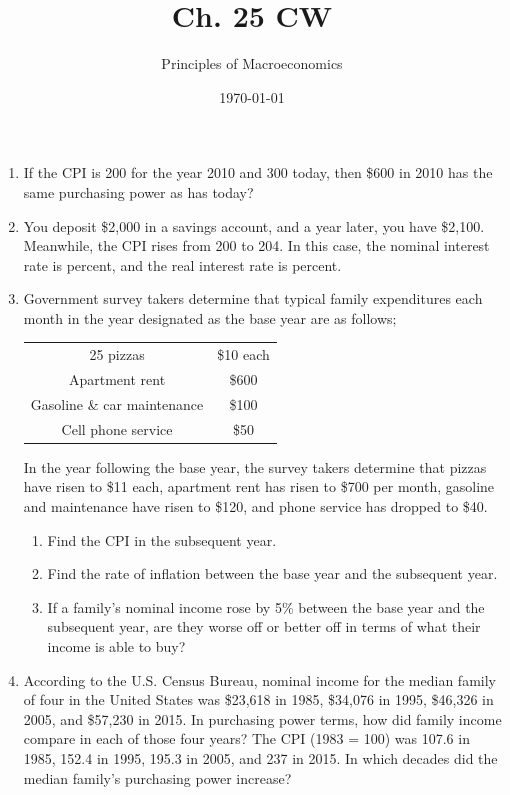 \documentclass{article}
\title{Ch. 25 CW}
\author{Principles of Macroeconomics}
\date{\today}
\begin{document}
\maketitle

\begin{enumerate}

\item If the CPI is 200 for the year 2010 and 300 today, then \$600 in 2010 has the same purchasing power as \underline{\phantom{xxxxxxxxxx}} has today?

\item You deposit \$2,000 in a savings account, and a year later, you have \$2,100. Meanwhile, the CPI rises from 200 to 204. In this case, the nominal interest rate is \underline{\phantom{xxxxxxxxxx}} percent, and the real interest rate is \underline{\phantom{xxxxxxxxxx}} percent.

\item Government survey takers determine that typical family expenditures each month in the year designated as the base year are as follows;
	\begin{center}
	\begin{tabular}{c c}
	25 pizzas & \$10 each \\
	Apartment rent & \$600 \\
	Gasoline \& car maintenance & \$100 \\
	Cell phone service & \$50
	\end{tabular}
	\end{center}
In the year following the base year, the survey takers determine that pizzas have risen to \$11 each, apartment rent has risen to \$700 per month, gasoline and maintenance have risen to \$120, and phone service has dropped to \$40.

	\begin{enumerate}

	\item Find the CPI in the subsequent year. 
	
	\item Find the rate of inflation between the base year and the subsequent year.
	
	\item If a family's nominal income rose by 5\% between the base year and the subsequent year, are they worse off or better off in terms of what their income is able to buy?
	
	\end{enumerate}

\item According to the U.S. Census Bureau, nominal income for the median family of four in the United States was \$23,618 in 1985, \$34,076 in 1995, \$46,326 in 2005, and \$57,230 in 2015. In purchasing power terms, how did family income compare in each of those four years? The CPI (1983 = 100) was 107.6 in 1985, 152.4 in 1995, 195.3 in 2005, and 237 in 2015. In which decades did the median family's purchasing power increase?


\end{enumerate}
\end{document}
